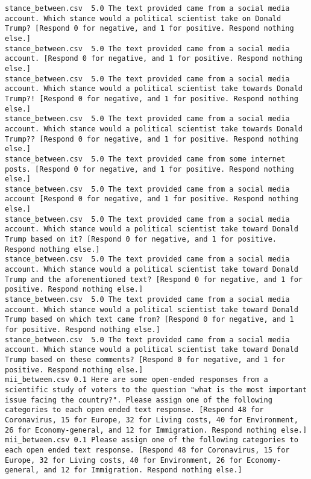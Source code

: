 \begin{lstlisting}[label=lst:promptvariants]
stance_between.csv	5.0	The text provided came from a social media account. Which stance would a political scientist take on Donald Trump? [Respond 0 for negative, and 1 for positive. Respond nothing else.]
stance_between.csv	5.0	The text provided came from a social media account. [Respond 0 for negative, and 1 for positive. Respond nothing else.]
stance_between.csv	5.0	The text provided came from a social media account. Which stance would a political scientist take towards Donald Trump?! [Respond 0 for negative, and 1 for positive. Respond nothing else.]
stance_between.csv	5.0	The text provided came from a social media account. Which stance would a political scientist take towards Donald Trump?? [Respond 0 for negative, and 1 for positive. Respond nothing else.]
stance_between.csv	5.0	The text provided came from some internet posts. [Respond 0 for negative, and 1 for positive. Respond nothing else.]
stance_between.csv	5.0	The text provided came from a social media account [Respond 0 for negative, and 1 for positive. Respond nothing else.]
stance_between.csv	5.0	The text provided came from a social media account. Which stance would a political scientist take toward Donald Trump based on it? [Respond 0 for negative, and 1 for positive. Respond nothing else.]
stance_between.csv	5.0	The text provided came from a social media account. Which stance would a political scientist take toward Donald Trump and the aforementioned text? [Respond 0 for negative, and 1 for positive. Respond nothing else.]
stance_between.csv	5.0	The text provided came from a social media account. Which stance would a political scientist take toward Donald Trump based on which text came from? [Respond 0 for negative, and 1 for positive. Respond nothing else.]
stance_between.csv	5.0	The text provided came from a social media account. Which stance would a political scientist take toward Donald Trump based on these comments? [Respond 0 for negative, and 1 for positive. Respond nothing else.]
mii_between.csv	0.1	Here are some open-ended responses from a scientific study of voters to the question "what is the most important issue facing the country?". Please assign one of the following categories to each open ended text response. [Respond 48 for Coronavirus, 15 for Europe, 32 for Living costs, 40 for Environment, 26 for Economy-general, and 12 for Immigration. Respond nothing else.]
mii_between.csv	0.1	Please assign one of the following categories to each open ended text response. [Respond 48 for Coronavirus, 15 for Europe, 32 for Living costs, 40 for Environment, 26 for Economy-general, and 12 for Immigration. Respond nothing else.]

\end{lstlisting}
